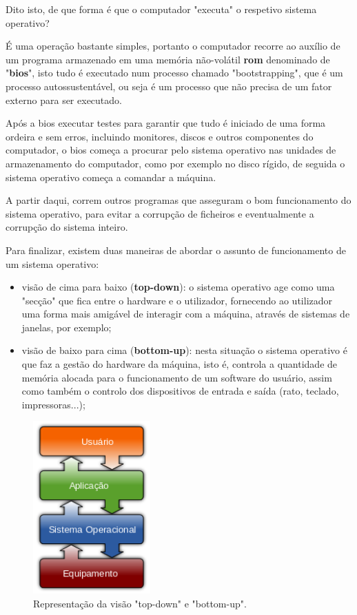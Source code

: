 \documentclass{report}
\begin{document}
\vspace{5mm} %

Dito isto, de que forma é que o computador "executa" o respetivo sistema operativo?

É uma operação bastante simples, portanto o computador recorre ao auxílio de um programa armazenado em uma memória não-volátil \textbf{\acs{rom}} denominado de "\textbf{\acs{bios}}", isto tudo é executado num processo chamado "bootstrapping", que é um processo autossustentável, ou seja é um processo que não precisa de um fator externo para ser executado.

Após a \acs{bios} executar testes para garantir que tudo é iniciado de uma forma ordeira e sem erros, incluindo monitores, discos e outros componentes do computador, o \acs{bios} começa a procurar pelo sistema operativo nas unidades de armazenamento do computador, como por exemplo no disco rígido, de seguida o sistema operativo começa a comandar a máquina.

A partir daqui, correm outros programas que asseguram o bom funcionamento do sistema operativo, para evitar a corrupção de ficheiros e eventualmente a corrupção do sistema inteiro.

\vspace{5mm} %

Para finalizar, existem duas maneiras de abordar o assunto de funcionamento de um sistema operativo:

\begin{itemize}
    \item visão de cima para baixo (\textbf{top-down}): o sistema operativo age como uma "secção" que fica entre o hardware e o utilizador, fornecendo ao utilizador uma forma mais amigável de interagir com a máquina, através de sistemas de janelas, por exemplo;
    \item visão de baixo para cima (\textbf{bottom-up}): nesta situação o sistema operativo é que faz a gestão do hardware da máquina, isto é, controla a quantidade de memória alocada para o funcionamento de um software do usuário, assim como também o controlo dos dispositivos de entrada e saída (rato, teclado, impressoras...);
\end{itemize}

\begin{figure}[h!]
\includegraphics[width=0.4\textwidth]{img_so.png}
\centering
\caption{Representação da visão "top-down" e "bottom-up".}
\end{figure}
\end{document}
